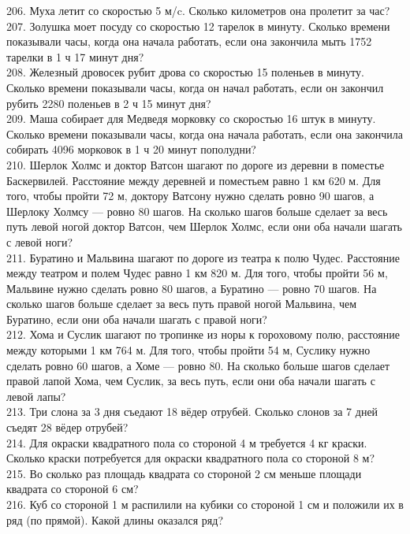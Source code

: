 206. Муха летит со скоростью 5 м/c. Сколько километров она пролетит за час?\\
207. Золушка моет посуду со скоростью 12 тарелок в минуту. Сколько времени показывали часы, когда она начала работать, если она закончила мыть 1752 тарелки в 1 ч 17 минут дня?\\
208. Железный дровосек рубит дрова со скоростью 15 поленьев в минуту. Сколько времени показывали часы, когда он начал работать, если он закончил рубить 2280 поленьев в 2 ч 15 минут дня?\\
209. Маша собирает для Медведя морковку со скоростью 16 штук в минуту. Сколько времени показывали часы, когда она начала работать, если она закончила собирать 4096 морковок в 1 ч 20 минут пополудни?\\
210. Шерлок Холмс и доктор Ватсон шагают по дороге из деревни в поместье Баскервилей. Расстояние между деревней и поместьем равно 1 км 620 м. Для того, чтобы пройти 72 м, доктору Ватсону нужно сделать ровно 90 шагов, а Шерлоку Холмсу --- ровно 80 шагов. На сколько шагов больше сделает за весь путь левой ногой доктор Ватсон, чем Шерлок Холмс, если они оба начали шагать с левой ноги?\\
211. Буратино и Мальвина шагают по дороге из театра к полю Чудес. Расстояние между театром и полем Чудес равно 1 км 820 м. Для того, чтобы пройти 56 м, Мальвине нужно сделать ровно 80 шагов, а Буратино --- ровно 70 шагов. На сколько шагов больше сделает за весь путь правой ногой Мальвина, чем Буратино, если они оба начали шагать с правой ноги?\\
212. Хома и Суслик шагают по тропинке из норы к гороховому полю, расстояние между которыми 1 км 764 м. Для того, чтобы пройти 54 м, Суслику нужно сделать ровно 60 шагов, а Хоме --- ровно 80. На сколько больше шагов сделает правой лапой Хома, чем Суслик, за весь путь, если они оба начали шагать с левой лапы?\\
213. Три слона за 3 дня съедают 18 вёдер отрубей. Сколько слонов за 7 дней съедят 28 вёдер отрубей?\\
214. Для окраски квадратного пола со стороной 4 м требуется 4 кг краски. Сколько краски потребуется для окраски квадратного пола со стороной 8 м?\\
215. Во сколько раз площадь квадрата со стороной 2 см меньше площади квадрата со стороной 6 см?\\
216. Куб со стороной 1 м распилили на кубики со стороной 1 см и положили их в ряд (по прямой). Какой длины оказался ряд?\\
